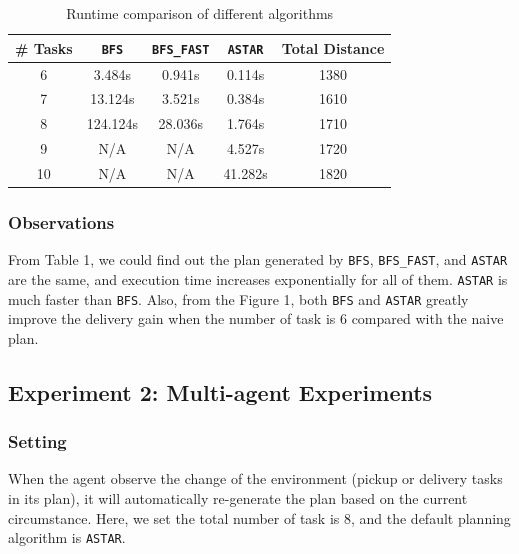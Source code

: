 \documentclass[10.5pt]{article}
\begin{document}
\begin{table}[!h]
\begin{center}
\begin{tabular}{|c|c|c|c|c|}
\hline
 \# Tasks	&\texttt{BFS}		&\texttt{BFS\_FAST}	&\texttt{ASTAR}		&Total Distance  \\ \hline
 6	&3.484s	&0.941s	&0.114s  &1380  \\ \hline
 7	&13.124s		&3.521s	&0.384s  &1610  \\ \hline
 8	&124.124s  &28.036s	&1.764s  &1710  \\ \hline
 9	&N/A  &N/A  &4.527s  &1720  \\ \hline
 10	&N/A  &N/A  &41.282s  &1820  \\ \hline
\end{tabular}
\caption{Runtime comparison of different algorithms}
\label{tab:my-table}
\end{center}
\end{table}

\subsubsection{Observations}
From Table 1, we could find out the plan generated by \texttt{BFS}, \texttt{BFS\_FAST}, and \texttt{ASTAR} are the same, and execution time increases exponentially for all of them. \texttt{ASTAR} is much faster than \texttt{BFS}. Also, from the Figure 1, both \texttt{BFS} and \texttt{ASTAR} greatly improve the delivery gain when the number of task is 6 compared with the naive plan.


\subsection{Experiment 2: Multi-agent Experiments}

\subsubsection{Setting}
When the agent observe the change of the environment (pickup or delivery tasks in its plan), it will automatically re-generate the plan based on the current circumstance. Here, we set the total number of task is 8, and the default planning algorithm is \texttt{ASTAR}.
\end{document}
